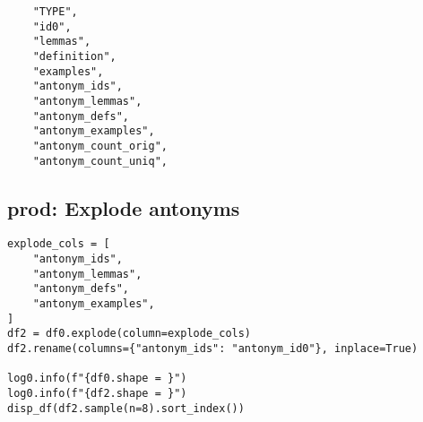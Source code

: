 \documentclass[a4paper,10pt,onecolumn,oneside,openright]{article}
\begin{document}
\begin{verbatim}
    "TYPE",
    "id0",
    "lemmas",
    "definition",
    "examples",
    "antonym_ids",
    "antonym_lemmas",
    "antonym_defs",
    "antonym_examples",
    "antonym_count_orig",
    "antonym_count_uniq",
\end{verbatim}
\subsection{prod: Explode antonyms}
\label{sec:orgeab0102}
\begin{verbatim}
explode_cols = [
    "antonym_ids",
    "antonym_lemmas",
    "antonym_defs",
    "antonym_examples",
]
df2 = df0.explode(column=explode_cols)
df2.rename(columns={"antonym_ids": "antonym_id0"}, inplace=True)

log0.info(f"{df0.shape = }")
log0.info(f"{df2.shape = }")
disp_df(df2.sample(n=8).sort_index())
\end{verbatim}
\end{document}
